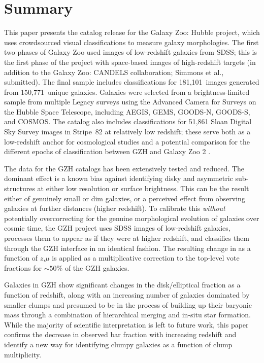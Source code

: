 \documentclass[twocolumn]{aastex6}
\begin{document}
\section{Summary}\label{sec:summary}


This paper presents the catalog release for the Galaxy Zoo: Hubble project, which uses crowdsourced visual classifications to measure galaxy morphologies. The first two phases of Galaxy Zoo \citep{lin11,wil13} used images of low-redshift galaxies from SDSS; this is the first phase of the project with space-based images of high-redshift targets (in addition to the Galaxy Zoo: CANDELS collaboration; Simmons et al., submitted). The final sample includes classifications for 181,101~images generated from 150,771~unique galaxies. Galaxies were selected from a brightness-limited sample from multiple Legacy surveys using the Advanced Camera for Surveys on the Hubble Space Telescope, including AEGIS, GEMS, GOODS-N, GOODS-S, and COSMOS. The catalog also includes classifications for 51,861 Sloan Digital Sky Survey images in Stripe~82 at relatively low redshift; these serve both as a low-redshift anchor for cosmological studies and a potential comparison for the different epochs of classification between GZH and Galaxy Zoo 2 \citep{wil13}. 

The data for the GZH catalogs has been extensively tested and reduced. The dominant effect is a known bias against identifying disky and asymmetric sub-structures at either low resolution or surface brightness. This can be the result either of genuinely small or dim galaxies, or a perceived effect from observing galaxies at further distances (higher redshift). To calibrate this \emph{without} potentially overcorrecting for the genuine morphological evolution of galaxies over cosmic time, the GZH project uses SDSS images of low-redshift galaxies, processes them to appear as if they were at higher redshift, and classifies them through the GZH interface in an identical fashion. The resulting change in \pfeatures{} as a function of $z$,$\mu$ is applied as a multiplicative correction to the top-level vote fractions for $\sim50\%$ of the GZH galaxies. 

Galaxies in GZH show significant changes in the disk/elliptical fraction as a function of redshift, along with an increasing number of galaxies dominated by smaller clumps and presumed to be in the process of building up their baryonic mass through a combination of hierarchical merging and in-situ star formation. While the majority of scientific interpretation is left to future work, this paper confirms the decrease in observed bar fraction with increasing redshift \citep{mel14} and identify a new way for identifying clumpy galaxies as a function of clump multiplicity.
\end{document}
